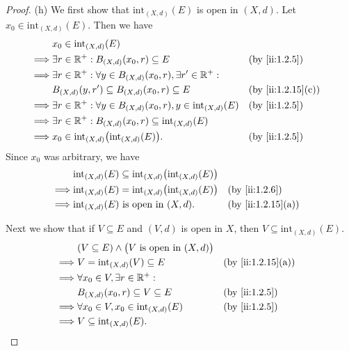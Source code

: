 \begin{proof}{(h)}
  We first show that \(\text{int}_{(X, d)}(E)\) is open in \((X, d)\).
  Let \(x_0 \in \text{int}_{(X, d)}(E)\).
  Then we have
  \begin{align*}
             & x_0 \in \text{int}_{(X, d)}(E)                                                                             \\
    \implies & \exists r \in \R^+ : B_{(X, d)}(x_0, r) \subseteq E                                 &  & \by{ii:1.2.5}     \\
    \implies & \exists r \in \R^+ : \forall y \in B_{(X, d)}(x_0, r), \exists r' \in \R^+ :                               \\
             & B_{(X, d)}(y, r') \subseteq B_{(X, d)}(x_0, r) \subseteq E                          &  & \by{ii:1.2.15}[c] \\
    \implies & \exists r \in \R^+ : \forall y \in B_{(X, d)}(x_0, r), y \in \text{int}_{(X, d)}(E) &  & \by{ii:1.2.5}     \\
    \implies & \exists r \in \R^+ : B_{(X, d)}(x_0, r) \subseteq \text{int}_{(X, d)}(E)                                   \\
    \implies & x_0 \in \text{int}_{(X, d)}\big(\text{int}_{(X, d)}(E)\big).                        &  & \by{ii:1.2.5}
  \end{align*}
  Since \(x_0\) was arbitrary, we have
  \begin{align*}
             & \text{int}_{(X, d)}(E) \subseteq \text{int}_{(X, d)}\big(\text{int}_{(X, d)}(E)\big)                        \\
    \implies & \text{int}_{(X, d)}(E) = \text{int}_{(X, d)}\big(\text{int}_{(X, d)}(E)\big)         &  & \by{ii:1.2.6}     \\
    \implies & \text{int}_{(X, d)}(E) \text{ is open in } (X, d).                                   &  & \by{ii:1.2.15}[a]
  \end{align*}

  Next we show that if \(V \subseteq E\) and \((V, d)\) is open in \(X\), then \(V \subseteq \text{int}_{(X, d)}(E)\).
  \begin{align*}
             & (V \subseteq E) \land \big(V \text{ is open in } (X, d)\big)                        \\
    \implies & V = \text{int}_{(X, d)}(V) \subseteq E                       &  & \by{ii:1.2.15}[a] \\
    \implies & \forall x_0 \in V, \exists r \in \R^+ :                                             \\
             & B_{(X, d)}(x_0, r) \subseteq V \subseteq E                   &  & \by{ii:1.2.5}     \\
    \implies & \forall x_0 \in V, x_0 \in \text{int}_{(X, d)}(E)            &  & \by{ii:1.2.5}     \\
    \implies & V \subseteq \text{int}_{(X, d)}(E).
  \end{align*}


\end{proof}

